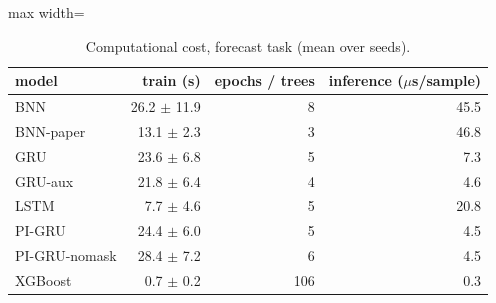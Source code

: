 \begin{table}[H]
\centering\small
\caption{Computational cost, forecast task (mean over seeds).}\label{tab:cost_forecast}
\begin{adjustbox}{max width=\textwidth}
\begin{tabular}{lrrr}
\toprule
model & train (s) & epochs / trees & inference ($\mu$s/sample) \\
\midrule
BNN & 26.2 $\pm$ 11.9 & 8 & 45.5 \\
BNN-paper & 13.1 $\pm$ 2.3 & 3 & 46.8 \\
GRU & 23.6 $\pm$ 6.8 & 5 & 7.3 \\
GRU-aux & 21.8 $\pm$ 6.4 & 4 & 4.6 \\
LSTM & 7.7 $\pm$ 4.6 & 5 & 20.8 \\
PI-GRU & 24.4 $\pm$ 6.0 & 5 & 4.5 \\
PI-GRU-nomask & 28.4 $\pm$ 7.2 & 6 & 4.5 \\
XGBoost & 0.7 $\pm$ 0.2 & 106 & 0.3 \\
\bottomrule
\end{tabular}
\end{adjustbox}
\end{table}
